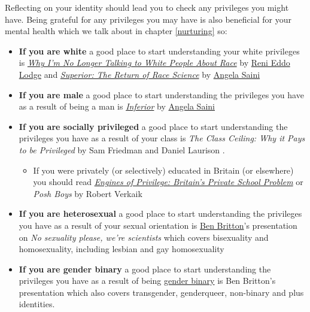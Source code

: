 \documentclass[
]{book}
\providecommand{\tightlist}{%
  \setlength{\itemsep}{0pt}\setlength{\parskip}{0pt}}
\begin{document}
Reflecting on your identity should lead you to check any privileges you might have. Being grateful for any privileges you may have is also beneficial for your mental health which we talk about in chapter \ref{nurturing} so:

\begin{itemize}
\tightlist
\item
  \textbf{If you are white} a good place to start understanding your white privileges is \emph{\href{https://en.wikipedia.org/wiki/Why_I\textquotesingle{}m_No_Longer_Talking_to_White_People_About_Race}{Why I'm No Longer Talking to White People About Race}} by \href{https://en.wikipedia.org/wiki/Reni_Eddo-Lodge}{Reni Eddo Lodge} \citep{nottalking} and \emph{\href{https://en.wikipedia.org/wiki/Superior:_The_Return_of_Race_Science}{Superior: The Return of Race Science}} by \href{https://en.wikipedia.org/wiki/Angela_Saini}{Angela Saini}
\item
  \textbf{If you are male} a good place to start understanding the privileges you have as a result of being a man is \emph{\href{https://en.wikipedia.org/wiki/Inferior_(book)}{Inferior}} by \href{https://en.wikipedia.org/wiki/Angela_Saini}{Angela Saini} \citep{inferior}
\item
  \textbf{If you are socially privileged} a good place to start understanding the privileges you have as a result of your class is \emph{The Class Ceiling: Why it Pays to be Privileged} by Sam Friedman and Daniel Laurison \citep{classceiling}.

  \begin{itemize}
  \tightlist
  \item
    If you were privately (or selectively) educated in Britain (or elsewhere) you should read \emph{\href{https://en.wikipedia.org/wiki/Engines_of_Privilege}{Engines of Privilege: Britain's Private School Problem}} \citep{nicebutdim} or \emph{Posh Boys} by Robert Verkaik \citep{poshboys}
  \end{itemize}
\item
  \textbf{If you are heterosexual} a good place to start understanding the privileges you have as a result of your sexual orientation is \href{https://en.wikipedia.org/wiki/Ben_Britton}{Ben Britton}'s presentation on \emph{No sexuality please, we're scientists} \citep{nosex} which covers bisexuality and homosexuality, including lesbian and gay homosexuality
\item
  \textbf{If you are gender binary} a good place to start understanding the privileges you have as a result of being \href{https://en.wikipedia.org/wiki/Gender_binary}{gender binary} is Ben Britton's presentation \citep{nosex} which also covers transgender, genderqueer, non-binary and plus identities.
\end{itemize}
\end{document}
